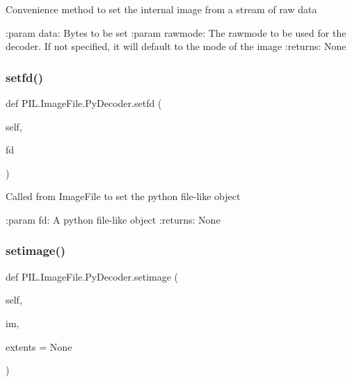 \begin{DoxyVerb}Convenience method to set the internal image from a stream of raw data

:param data: Bytes to be set
:param rawmode: The rawmode to be used for the decoder.
    If not specified, it will default to the mode of the image
:returns: None
\end{DoxyVerb}
 \mbox{\label{classPIL_1_1ImageFile_1_1PyDecoder_aeb90248e85ea28be721bac7f0723c299}} 
\subsubsection{\texorpdfstring{setfd()}{setfd()}}
{\footnotesize\ttfamily def P\+I\+L.\+Image\+File.\+Py\+Decoder.\+setfd (\begin{DoxyParamCaption}\item[{}]{self,  }\item[{}]{fd }\end{DoxyParamCaption})}

\begin{DoxyVerb}Called from ImageFile to set the python file-like object

:param fd: A python file-like object
:returns: None
\end{DoxyVerb}
 \mbox{\label{classPIL_1_1ImageFile_1_1PyDecoder_a7e53b219c879d8b13ec36c384f10cdbd}} 
\subsubsection{\texorpdfstring{setimage()}{setimage()}}
{\footnotesize\ttfamily def P\+I\+L.\+Image\+File.\+Py\+Decoder.\+setimage (\begin{DoxyParamCaption}\item[{}]{self,  }\item[{}]{im,  }\item[{}]{extents = {\ttfamily None} }\end{DoxyParamCaption})}

